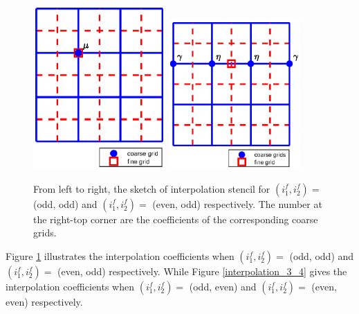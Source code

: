 \begin{figure}[htbp]
	\centering
	\includegraphics[width=0.45\textwidth]{interpolation1.eps}
	\includegraphics[width=0.45\textwidth]{interpolation2.eps}
	\caption{From left to right, the sketch of interpolation stencil for $(i_1^f,i_2^f) =$ (odd, odd) and $(i_1^f,i_2^f) =$ (even, odd) respectively. The number at the right-top corner are the coefficients of the corresponding coarse grids.}\label{interpolation_1_2}
\end{figure}
Figure \ref{interpolation_1_2} illustrates the interpolation coefficients when $(i_1^f,i_2^f) = $ (odd, odd) and  $(i_1^f,i_2^f) = $ (even, odd) respectively. While Figure \ref{interpolation_3_4} gives the interpolation coefficients when $(i_1^f,i_2^f) = $ (odd, even) and  $(i_1^f,i_2^f) = $ (even, even) respectively.

